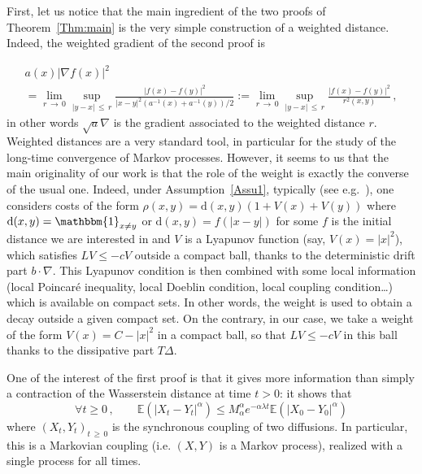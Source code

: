 \documentclass[10pt]{amsart}
\theoremstyle{definition}\newtheorem{defi}[theo]{Definition}\newtheorem{rema}[theo]{Remark}\newtheorem{exam}[theo]{Example}\newtheorem{exem}[theo]{Example}\newtheorem{nota}[theo]{Notation}
\newcommand{\bbE}{\mathbb E}
\newcommand{\na}{\nabla}
\newcommand{\1}{\mathbbm{1}}
\newcommand{\rmd}{\mathrm{d}}
\newcommand{\nv}[1]{#1}
\let\oldforall\forall
\renewcommand*{\forall}{\mathrel{\oldforall}}
\begin{document}
First, let us notice that the main ingredient of the two proofs of Theorem~\ref{Thm:main} is the very simple construction of a weighted distance. Indeed, the weighted gradient of the second proof is

\begin{multline*}
a(x) |\na f(x)|^2 \\
= \lim_{r\,\rightarrow\,0}\sup_{|y-x|\,\leqslant\,r} \frac{|f(x)-f(y)|^2}{|x-y|^2 \left( a^{-1}(x)+a^{-1}(y)\right)/2 } := \lim_{r\,\rightarrow\,0}\sup_{|y-x|\,\leqslant\,r} \frac{|f(x)-f(y)|^2}{r^2(x,y) }\,,
\end{multline*}
in other words $\sqrt{a}\na$ is the gradient associated to the weighted distance $r$. Weighted distances are a very standard tool, in particular for the study of the long-time convergence of Markov processes. However, it seems to us that the main originality of our work is that the role of the weight is exactly the converse of the usual one. Indeed, under Assumption~\ref{Assu1}, typically (see e.g.~\cite{EberleGuillinZimmer,EberleMajka,HMWasserstein,
HairerMattingly2008,MonmarcheElementary}), one considers \nv{costs} of the form $\rho(x,y) = \rmd(x,y)(1+V(x)+V(y))$ where $\rmd(x,y)=\1_{x\neq y}$ or $\rmd(x,y)=f(|x-y|)$ for some $f$ is the initial distance we are interested in and $V$ is a Lyapunov function (say, $V(x) = |x|^2$), which satisfies $LV\leqslant - cV$ outside a compact ball, thanks to the deterministic drift part $b\cdot \na$. This Lyapunov condition is then combined with some local information (local Poincaré inequality, local Doeblin condition, local coupling condition\dots) which is available on compact sets. In other words, the weight is used to obtain a decay outside a given compact set. On the contrary, in our case, we take a weight of the form $V(x) = C-|x|^2$ in a compact ball, so that $LV\leqslant -cV$ in this ball thanks to the dissipative part $T\Delta$.

One of the interest of the first proof is that it gives more information than simply a contraction of the Wasserstein distance at time $t>0$: it shows that
\[
\forall t\geqslant 0\,,\qquad \bbE \left( |X_t-Y_t|^\alpha\right) \leqslant M_\alpha^\alpha e^{-\alpha \lambda t} \bbE \left( |X_0-Y_0|^\alpha\right)
\]
where $(X_t,Y_t)_{t\,\geqslant\,0}$ is the synchronous coupling of two diffusions. In particular, this is a Markovian coupling (i.e. $(X,Y)$ is a Markov process), realized with a single process for all times.
\end{document}
